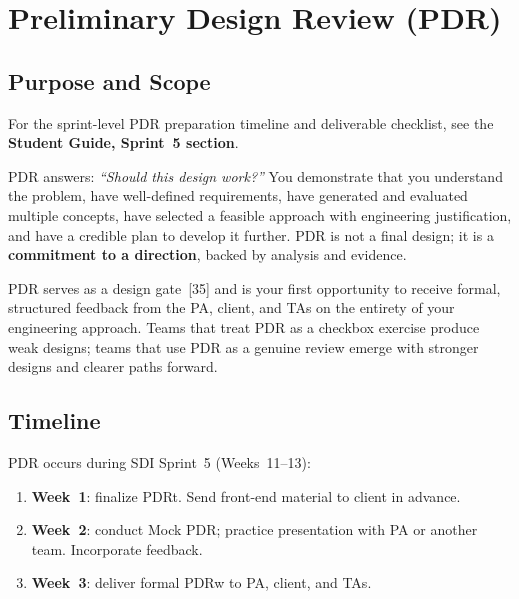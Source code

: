 \chapter{Preliminary Design Review (PDR)}

\section{Purpose and Scope}

\begin{tipbox}
For the sprint-level PDR preparation timeline and deliverable checklist, see the \textbf{Student Guide, Sprint~5 section}.
\end{tipbox}

PDR answers: \emph{``Should this design work?''} You demonstrate that you understand the problem, have well-defined requirements, have generated and evaluated multiple concepts, have selected a feasible approach with engineering justification, and have a credible plan to develop it further. PDR is not a final design; it is a \textbf{commitment to a direction}, backed by analysis and evidence.

PDR serves as a design gate~[35] and is your first opportunity to receive formal, structured feedback from the PA, client, and TAs on the entirety of your engineering approach. Teams that treat PDR as a checkbox exercise produce weak designs; teams that use PDR as a genuine review emerge with stronger designs and clearer paths forward.

\section{Timeline}
PDR occurs during SDI Sprint~5 (Weeks~11--13):
\begin{enumerate}[nosep,leftmargin=1.5em]
\item \textbf{Week~1}: finalize PDRt. Send front-end material to client in advance.
\item \textbf{Week~2}: conduct Mock PDR; practice presentation with PA or another team. Incorporate feedback.
\item \textbf{Week~3}: deliver formal PDRw to PA, client, and TAs.
\end{enumerate}

